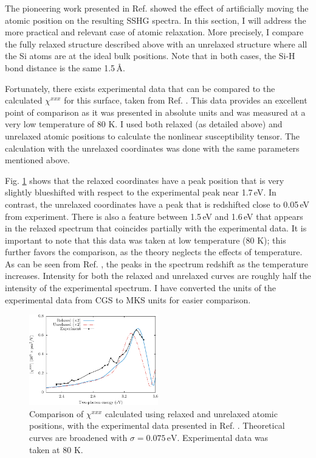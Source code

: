The pioneering work presented in Ref. \cite{mejiaPRB02} showed the effect of
artificially moving the atomic position on the resulting SSHG spectra. In this
section, I will address the more practical and relevant case of atomic
relaxation. More precisely, I compare the fully relaxed structure described
above with an unrelaxed structure where all the Si atoms are at the ideal bulk
positions. Note that in both cases, the Si-H bond distance is the same 1.5\,\AA.

Fortunately, there exists experimental data that can be compared to the
calculated $\chi^{xxx}$ for this surface, taken from Ref. \cite{hoferAPA96}.
This data provides an excellent point of comparison as it was presented in
absolute units and was measured at a very low temperature of 80 K. I used both
relaxed (as detailed above) and unrelaxed atomic positions to calculate the
nonlinear susceptibility tensor. The calculation with the unrelaxed coordinates
was done with the same parameters mentioned above.

Fig. \ref{fig:Xxxx} shows that the relaxed coordinates have a peak position that
is very slightly blueshifted with respect to the experimental peak near 1.7\,eV.
In contrast, the unrelaxed coordinates have a peak that is redshifted close to
0.05\,eV from experiment. There is also a feature between 1.5\,eV and 1.6\,eV
that appears in the relaxed spectrum that coincides partially with the
experimental data. It is important to note that this data was taken at low
temperature (80 K); this further favors the comparison, as the theory neglects
the effects of temperature. As can be seen from Ref. \cite{hoferAPA96}, the
peaks in the spectrum redshift as the temperature increases. Intensity for both
the relaxed and unrelaxed curves are roughly half the intensity of the
experimental spectrum. I have converted the units of the experimental data from
CGS to MKS units for easier comparison.

\begin{figure}[H]
\centering
\includegraphics[width=0.5\textwidth]{content/figures/fig-4_3_01}
\caption{Comparison of
$\chi^{xxx}$ calculated using relaxed and unrelaxed
atomic positions, with the experimental data presented in Ref.
\cite{hoferAPA96}. Theoretical curves are broadened with
$\sigma=0.075\,\text{eV}$. Experimental data was taken at 80 K.}
\label{fig:Xxxx}
\end{figure}

